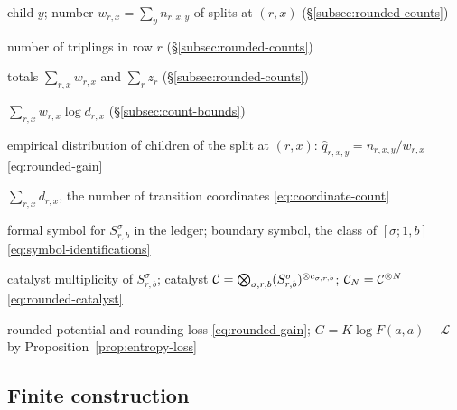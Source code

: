 {\begin{list}{}
 child \(y\); number \(w_{r,x}=\sum_yn_{r,x,y}\) of splits at
 \((r,x)\) (\S\ref{subsec:rounded-counts})
\item[\(z_r\)] number of triplings in row \(r\)
 (\S\ref{subsec:rounded-counts})
\item[\(\bar w\), \(\bar z\)] totals \(\sum_{r,x}w_{r,x}\) and
 \(\sum_rz_r\) (\S\ref{subsec:rounded-counts})
\item[\(W\)] \(\sum_{r,x}w_{r,x}\log d_{r,x}\)
 (\S\ref{subsec:count-bounds})
\item[\(\hat q_{r,x}\)] empirical distribution of children of the split
 at \((r,x)\): \(\hat q_{r,x,y}=n_{r,x,y}/w_{r,x}\)
 \eqref{eq:rounded-gain}
\item[\(J_a\)] \(\sum_{r,x}d_{r,x}\), the number of transition
 coordinates \eqref{eq:coordinate-count}
\item[{\([\sigma;r,b]\), \([\MM_b]\)}] formal symbol for
 \(S^\sigma_{r,b}\) in the ledger; boundary symbol, the class of
 \([\sigma;1,b]\) \eqref{eq:symbol-identifications}
\item[\(c_{\sigma,r,b}\), \(\Cat\), \(\Cat_N\)] catalyst multiplicity of
 \(S^\sigma_{r,b}\); catalyst
 \(\mathcal C=\bigotimes_{\sigma,r,b}(S^\sigma_{r,b})^{\otimes c_{\sigma,r,b}}\);
 \(\mathcal C_N=\mathcal C^{\otimes N}\) \eqref{eq:rounded-catalyst}
\item[\(G\), \(\mathcal L\)] rounded potential and rounding loss
 \eqref{eq:rounded-gain}; \(G=K\log F(a,a)-\mathcal L\) by
 Proposition~\ref{prop:entropy-loss}
\end{list}

\subsection*{Finite construction}

}
